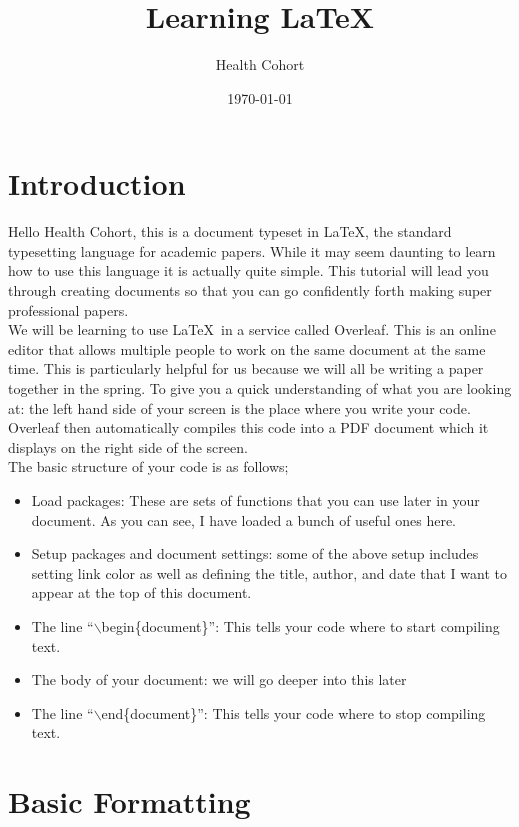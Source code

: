 \documentclass{article}
\title{Learning \LaTeX}
\author{Health Cohort}
\date{\today}
\begin{document}
	\maketitle
	\onehalfspacing
	
	\section{Introduction}
	Hello Health Cohort, this is a document typeset in \LaTeX, the standard typesetting language for academic papers. While it may seem daunting to learn how to use this language it is actually quite simple. This tutorial will lead you through creating documents so that you can go confidently forth making super professional papers.\\
	
	We will be learning to use \LaTeX \ in a service called Overleaf. This is an online editor that allows multiple people to work on the same document at the same time. This is particularly helpful for us because we will all be writing a paper together in the spring. To give you a quick understanding of what you are looking at: the left hand side of your screen is the place where you write your code. Overleaf then automatically compiles this code into a PDF document which it displays on the right side of the screen.\\
	
	The basic structure of your code is as follows; 
	
	\begin{itemize}
		\item Load packages: These are sets of functions that you can use later in your document. As you can see, I have loaded a bunch of useful ones here.
		\item Setup packages and document settings: some of the above setup includes setting link color as well as defining the title, author, and date that I want to appear at the top of this document.
		\item The line ``$\backslash$begin\{document\}'': This tells your code where to start compiling text.
		\item The body of your document: we will go deeper into this later
		\item The line ``$\backslash$end\{document\}'': This tells your code where to stop compiling text.
	\end{itemize}
	
	\section{Basic Formatting}
	
\end{document}
